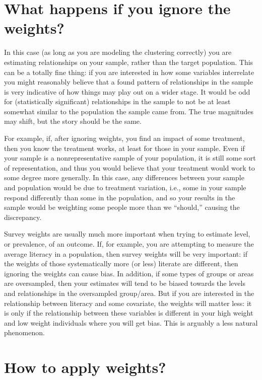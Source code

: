 \documentclass[
  letterpaper,
  DIV=11,
  numbers=noendperiod]{scrreprt}
\begin{document}
\hypertarget{what-happens-if-you-ignore-the-weights}{%
\section{What happens if you ignore the
weights?}\label{what-happens-if-you-ignore-the-weights}}

In this case (as long as you are modeling the clustering correctly) you
are estimating relationships on your sample, rather than the target
population. This can be a totally fine thing: if you are interested in
how some variables interrelate you might reasonably believe that a found
pattern of relationships in the sample is very indicative of how things
may play out on a wider stage. It would be odd for (statistically
significant) relationships in the sample to not be at least somewhat
similar to the population the sample came from. The true magnitudes may
shift, but the story should be the same.

For example, if, after ignoring weights, you find an impact of some
treatment, then you know the treatment works, at least for those in your
sample. Even if your sample is a nonrepresentative sample of your
population, it is still some sort of representation, and thus you would
believe that your treatment would work to some degree more generally. In
this case, any differences between your sample and population would be
due to treatment variation, i.e., some in your sample respond
differently than some in the population, and so your results in the
sample would be weighting some people more than we ``should,'' causing
the discrepancy.

Survey weights are usually much more important when trying to estimate
level, or prevalence, of an outcome. If, for example, you are attempting
to measure the average literacy in a population, then survey weights
will be very important: if the weights of those systematically more (or
less) literate are different, then ignoring the weights can cause bias.
In addition, if some types of groups or areas are oversampled, then your
estimates will tend to be biased towards the levels and relationships in
the oversampled group/area. But if you are interested in the
relationship between literacy and some covariate, the weights will
matter less: it is only if the relationship between these variables is
different in your high weight and low weight individuals where you will
get bias. This is arguably a less natural phenomenon.

\hypertarget{how-to-apply-weights}{%
\section{How to apply weights?}\label{how-to-apply-weights}}
\end{document}
